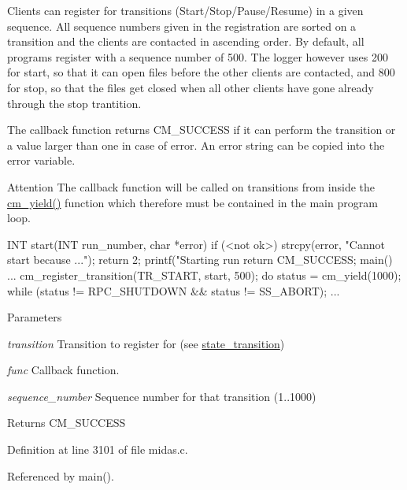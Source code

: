 Clients can register for transitions (Start/Stop/Pause/Resume) in a given sequence. All sequence numbers given in the registration are sorted on a transition and the clients are contacted in ascending order. By default, all programs register with a sequence number of 500. The logger however uses 200 for start, so that it can open files before the other clients are contacted, and 800 for stop, so that the files get closed when all other clients have gone already through the stop trantition.

The callback function returns CM\_\-SUCCESS if it can perform the transition or a value larger than one in case of error. An error string can be copied into the error variable. \begin{DoxyAttention}{Attention}
The callback function will be called on transitions from inside the \hyperlink{group__cmfunctionc_ga115565c5a1d9591fcabf844c1dd624f8}{cm\_\-yield()} function which therefore must be contained in the main program loop. 
\begin{DoxyCode}
INT start(INT run_number, char *error)
{
  if (<not ok>)
    {
    strcpy(error, "Cannot start because ...");
    return 2;
    }
  printf("Starting run %
  return CM_SUCCESS;
}
main()
{
  ...
  cm_register_transition(TR_START, start, 500);
  do
    {
    status = cm_yield(1000);
    } while (status != RPC_SHUTDOWN &&
             status != SS_ABORT);
  ...
}
\end{DoxyCode}
 
\end{DoxyAttention}

\begin{DoxyParams}{Parameters}
\item[{\em transition}]Transition to register for (see \hyperlink{RC_Run_States_and_Transitions_state_transition}{state\_\-transition}) \item[{\em func}]Callback function. \item[{\em sequence\_\-number}]Sequence number for that transition (1..1000) \end{DoxyParams}
\begin{DoxyReturn}{Returns}
CM\_\-SUCCESS 
\end{DoxyReturn}


Definition at line 3101 of file midas.c.

Referenced by main().
